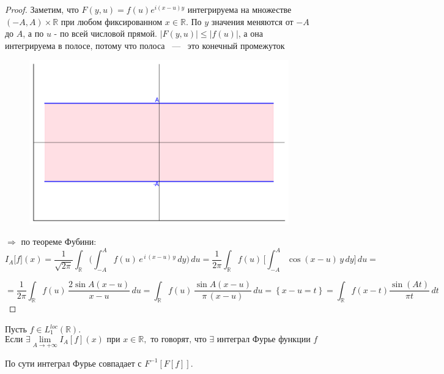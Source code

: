 \begin{proof}

Заметим, что $F(y, u) = f(u)e^{i(x-u)y}$ интегрируема на множестве $(-A, A) \times \mathbb{R}$ при любом фиксированном $x \in \mathbb{R}$. По $y$ значения меняются от $-A$ до $A$, а по $u$ - по всей числовой прямой. $|F(y, u)| \leq |f(u)|$, а она интегрируема в полосе, потому что полоса ~---~ это конечный промежуток

\begin{figure}[h]
    \centering
    \includegraphics[width=0.8\linewidth]{Pictures/graph1.png}
    \label{fig:graph1}
\end{figure}

$\Rightarrow$ по теореме Фубини:
\[
I_{A}\bigl[f\bigr](x)
= \frac{1}{\sqrt{2\pi}}
\int_{\mathbb{R}}
\Biggl(
\int_{-A}^{A} f(u)\,e^{\,i\,(x - u)\,y}\,dy
\Biggr)\,du
= \frac{1}{2\pi}
\int_{\mathbb{R}}
f(u)\,
\Biggl[
\int_{-A}^{A}
\cos(x - u)\,y\,dy
\Biggr]
\,du =
\]

\[
= \frac{1}{2\pi}
\int_{\mathbb{R}}
f(u)\,
\frac{2 \sin A(x - u)}{x - u}
\,du
=
\int_{\mathbb{R}}
f(u)\,
\frac{\sin A(x - u)}{\pi\,(x - u)}
\,du = \left\{
    x - u = t
\right\} =
\int_{\mathbb{R}}
f(x - t)
\frac{\sin(At)}{\pi t} \, dt
\]

\end{proof}

\begin{definition}
    Пусть $f \in L_1^{loc}(\mathbb{R})$.
\[
\text{Если } \exists \lim_{A \to +\infty} I_A[f](x) \text{ при } x \in \mathbb{R}, \text{ то говорят, что $\exists$ интеграл Фурье функции } f
\]

\begin{center}
    По сути интеграл Фурье совпадает с $F^{-1}[F[f]].$
\end{center}
\end{definition}

